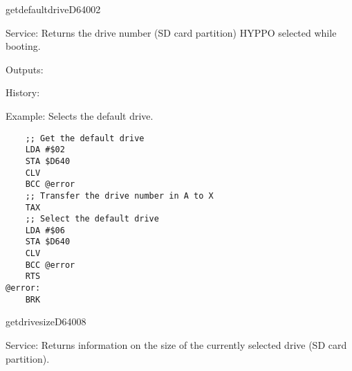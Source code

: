 \newpage
\begin{hyppotrap}{getdefaultdrive}{D640}{02}
\item [Service:]
  Returns the drive number (SD card partition) HYPPO selected while
  booting.
\item [Outputs:]
\item [History:]
\item [Example:]
  Selects the default drive.
\begin{tcolorbox}[colback=black,coltext=white]
\verbatimfont{\codefont}
\begin{verbatim}
    ;; Get the default drive
    LDA #$02
    STA $D640
    CLV
    BCC @error
    ;; Transfer the drive number in A to X
    TAX
    ;; Select the default drive
    LDA #$06
    STA $D640
    CLV
    BCC @error
    RTS
@error:
    BRK
\end{verbatim}
\end{tcolorbox}
\end{hyppotrap}


\newpage
\begin{hyppotrap}{getdrivesize}{D640}{08}
\item [Service:]
  Returns information on the size of the currently selected drive (SD card
  partition).
\notimplemented
\end{hyppotrap}


